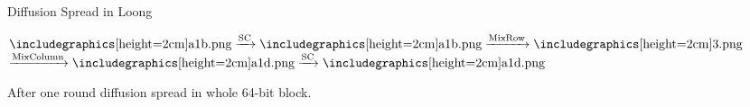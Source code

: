 \begin{frame}{Diffusion Spread in Loong}

\begin{center}
      $\TeaserImage{a1b.png} \xrightarrow{\text{SC}} \TeaserImage{a1b.png}
        \xrightarrow{\text{MixRow}} \TeaserImage{3.png} $
        $\xrightarrow{\text{MixColumn}}
        \TeaserImage{a1d.png} \xrightarrow{\text{SC}}\TeaserImage{a1d.png}$
\end{center}
After one round diffusion spread in whole 64-bit block.

    
\end{frame}
